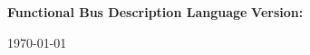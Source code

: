 \thispagestyle{empty}

\vspace*{5cm}

\begin{center}
\textbf{\Huge Functional Bus Description Language}
\vspace{1cm}
\newline
\textbf{\Large Version: \VersionNumber}
\par\end{center}{\Large \par}


\vfill

\begin{center}
\today
\par\end{center}{\large \par}

\newpage

